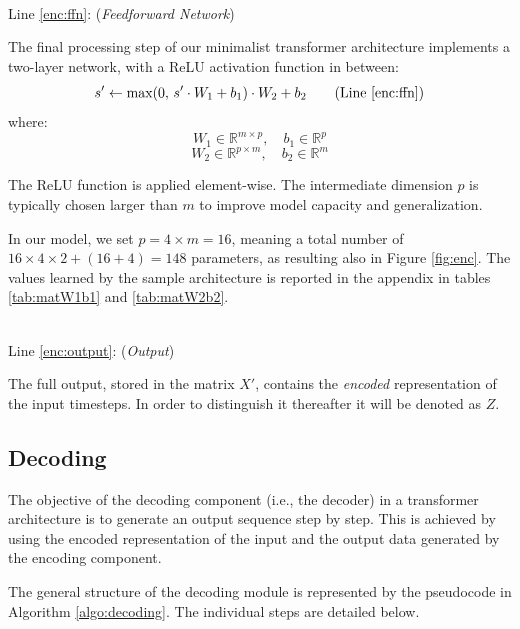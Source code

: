 \documentclass[algorithms,article,submit,pdftex,moreauthors]{Definitions/mdpi}
\begin{document}
~\\Line \ref{enc:ffn}: (\textit{Feedforward Network})

The final processing step of our minimalist transformer architecture implements a two-layer network, with a ReLU activation function in between:
\begin{equation}
    s' \leftarrow \text{max}(0,\,s'\cdot W_1 + b_1) \cdot W_2 + b_2
\tag{Line \ref{enc:ffn}}
\end{equation}
where:
$$
    W_1 \in \mathbb{R}^{m \times p},\quad
    b_1 \in \mathbb{R}^{p}
$$ $$
    W_2 \in \mathbb{R}^{p \times m},\quad
    b_2 \in \mathbb{R}^m
$$

The ReLU function is applied element-wise. The intermediate dimension $p$ is typically chosen larger than $m$ to improve model capacity and generalization. 

In our model, we set $p = 4 \times m = 16$, meaning a total number of $16 \times 4 \times 2 + (16 + 4) = 148$ parameters, as resulting also in Figure \ref{fig:enc}.
The values learned by the sample architecture is reported in the appendix in tables \ref{tab:matW1b1} and \ref{tab:matW2b2}.

~\\Line \ref{enc:output}: (\textit{Output})

The full output, stored in the matrix $X'$, contains the \textit{encoded} representation of the input timesteps. In order to distinguish it thereafter it will be denoted as $Z$. 

\subsection{Decoding} \label{subsec:decoding}

The objective of the decoding component (i.e., the decoder) in a transformer architecture is to generate an output sequence step by step. This is achieved by using the encoded representation of the input and the output data generated by the encoding component.

The general structure of the decoding module is represented by the pseudocode in Algorithm \ref{algo:decoding}. The individual steps are detailed below.
\end{document}
